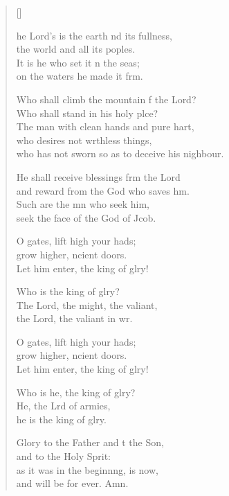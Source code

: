 \settowidth{\versewidth}{who has not sworn so as to deceive his neighbour.}
\begin{verse}[\versewidth]
  \begin{patverse}
    he Lord’s is the earth nd its fullness,\Med\\
    the world and all its poples.\\
It is he who set it n the seas;\Med\\
    on the waters he made it f\pointup{\i}rm.

Who shall climb the mountain f the Lord?\Med\\
    Who shall stand in his holy plce?\\
The man with clean hands and pure hart,\Flex\\
    who desires not wrthless things,\Med\\
    who has not sworn so as to deceive his nighbour.

He shall receive blessings frm the Lord\Med\\
    and reward from the God who saves h\pointup{\i}m.\\
Such are the mn who seek him,\Med\\
    seek the face of the God of Jcob.

O gates, lift high your hads;\Flex\\
    grow higher, ncient doors.\Med\\
    Let him enter, the king of glry!

Who is the king of glry?\Flex\\
    The Lord, the might, the valiant,\Med\\
    the Lord, the valiant in wr.

O gates, lift high your hads;\Flex\\
    grow higher, ncient doors.\Med\\
    Let him enter, the king of glry!

Who is he, the king of glry?\Flex\\
    He, the Lrd of armies,\Med\\
    he is the king of glry.

Glory to the Father and t the Son,\Med\\
    and to the Holy Sp\pointup{\i}rit:\\
as it was in the beginn\pointup{\i}ng, is now,\Med\\
    and will be for ever. Amn.
  \end{patverse}
\end{verse}
